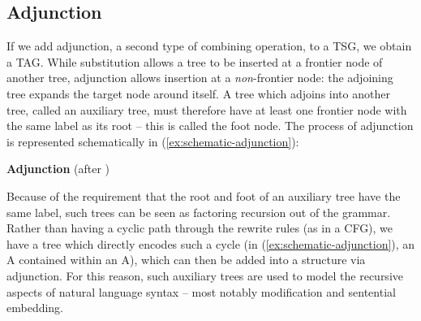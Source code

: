 \documentclass[output=paper,hidelinks]{langscibook}
\begin{document}

\largerpage
\subsection{Adjunction}\label{sec:TAG:adjunction}


If we add adjunction, a second type of combining operation, to a TSG, we obtain
a TAG. While substitution allows a tree to be inserted at a frontier node of
another tree, adjunction allows insertion at a \emph{non}-frontier node: the
adjoining tree expands the target node around itself. A tree which adjoins into
another tree, called an auxiliary tree, must therefore have at least one
frontier node with the same label as its root -- this is called the foot node.
The process of adjunction is represented schematically in
(\ref{ex:schematic-adjunction}):

\ea\label{ex:schematic-adjunction}\textbf{Adjunction} (after
\citealp[9]{abeille-rambow2000}) \evnup{%
\begin{tikzpicture}
  \draw (0,1)--(1.5,1)--(3,1)--(1.5,2.5)node[above]{S}--(0,1);
  \draw (1,1)--(1.5,1.5)node[above]{A}--(2,1);
  \filldraw[fill=lightgray,draw=none] (3.5,1.5)--(4.5,2.5)node[above]{A}--(5.5,1.5)--(4.5,1.5)node[below]{A\footnode}--(3.5,1.5);
  \node[scale=1.5] at (6.5,2) {$\Rightarrow$};
  \draw (7,1)--(8.5,1)node[below]{A}--(10,1)--(8.5,2.5)node[above]{S}--(7,1);
  \filldraw[fill=lightgray,draw=none] (8.5,1.5)node[above]{A}--(7.5,0.5)--(9.5,0.5)--(8.5,1.5);
  \draw (8.5,0.5)node[above]{A}--(8,0)--(9,0)--(8.5,0.5);
  \draw [thick,->,>=latex] (3.9,2.1) to [out=145,in=45] (1.7,1.9);
\end{tikzpicture}
}
\z

Because of the requirement that the root and foot of an auxiliary tree have the
same label, such trees can be seen as factoring recursion out of the grammar.
Rather than having a cyclic path through the rewrite rules (as in a CFG), we
have a tree which directly encodes such a cycle (in
(\ref{ex:schematic-adjunction}), an A contained within an A), which can then be
added into a structure via adjunction. For this reason, such auxiliary trees are
used to model the recursive aspects of natural language syntax -- most notably
modification and sentential embedding.
\end{document}
